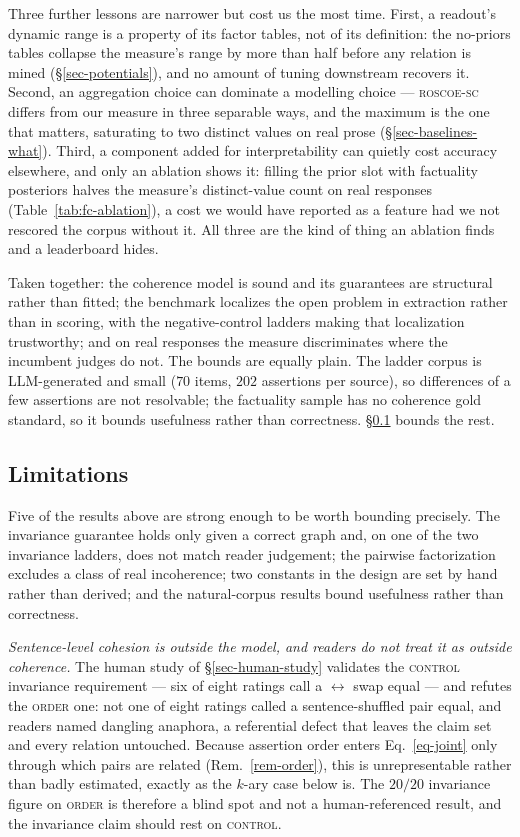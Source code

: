 Three further lessons are narrower but cost us the most time. First, a readout's dynamic range is a property of
its factor tables, not of its definition: the no-priors tables collapse the measure's range by more than half
before any relation is mined (\S\ref{sec-potentials}), and no amount of tuning downstream recovers it. Second,
an aggregation choice can dominate a modelling choice --- \textsc{roscoe-sc} differs from our measure in three
separable ways, and the maximum is the one that matters, saturating to two distinct values on real prose
(\S\ref{sec-baselines-what}). Third, a component added for interpretability can quietly cost accuracy
elsewhere, and only an ablation shows it: filling the prior slot with factuality posteriors halves the measure's
distinct-value count on real responses (Table~\ref{tab:fc-ablation}), a cost we would have reported as a
feature had we not rescored the corpus without it. All three are the kind of thing an ablation finds and a
leaderboard hides.

Taken together: the coherence model is sound and its guarantees are structural rather than fitted; the
benchmark localizes the open problem in extraction rather than in scoring, with the negative-control ladders
making that localization trustworthy; and on real responses the measure discriminates where the incumbent
judges do not. The bounds are equally plain. The ladder corpus is LLM-generated and small ($70$ items, $202$
assertions per source), so differences of a few assertions are not resolvable; the factuality sample has no
coherence gold standard, so it bounds usefulness rather than correctness. \S\ref{sec-limitations} bounds the
rest.

\subsection{Limitations}
\label{sec-limitations}

Five of the results above are strong enough to be worth bounding precisely. The invariance guarantee holds only
given a correct graph and, on one of the two invariance ladders, does not match reader judgement; the pairwise
factorization excludes a class of real incoherence; two constants in the design are set by hand rather than
derived; and the natural-corpus results bound usefulness rather than correctness.

\emph{Sentence-level cohesion is outside the model, and readers do not treat it as outside coherence.} The human
study of \S\ref{sec-human-study} validates the \textsc{control} invariance requirement --- six of eight ratings
call a $\leftrightarrow$ swap equal --- and refutes the \textsc{order} one:
not one of eight ratings called a sentence-shuffled pair equal, and readers named dangling anaphora, a
referential defect that leaves the claim set and every relation untouched. Because assertion order enters
Eq.~\ref{eq-joint} only through which pairs are related (Rem.~\ref{rem-order}), this is unrepresentable rather
than badly estimated, exactly as the $k$-ary case below is. The $20/20$ invariance figure on \textsc{order} is
therefore a blind spot and not a human-referenced result, and the invariance claim should rest on
\textsc{control}.

